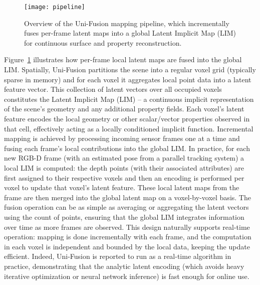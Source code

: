 \documentclass[english, bachelor, utf8]{base/thesis_telematics}
\begin{document}
\begin{figure}[!htb]
\centering
\texttt{[image: pipeline]}
\caption{Overview of the Uni-Fusion mapping pipeline, which incrementally fuses per-frame latent maps into a global Latent
Implicit Map (LIM) for continuous surface and property reconstruction.\cite{yuan2024uni}}
\label{fig:pipeline}
\end{figure}
Figure~\ref{fig:pipeline} illustrates how per-frame local latent maps are fused into the global LIM.
Spatially, Uni-Fusion partitions the scene into a regular voxel grid (typically sparse in memory) and for each voxel it
aggregates local point data into a latent feature vector. This collection of latent vectors over all occupied
voxels constitutes the Latent Implicit Map (LIM) -- a continuous implicit representation of the scene's geometry and any
additional property fields. Each voxel's latent feature encodes the local geometry or other scalar/vector properties observed in
that cell, effectively acting as a locally conditioned implicit function. Incremental mapping is achieved by processing incoming
sensor frames one at a time and fusing each frame's local contributions into the global LIM. In practice, for
each new RGB-D frame (with an estimated pose from a parallel tracking system) a local LIM is computed: the depth points
(with their associated attributes) are first assigned to their respective voxels and then an encoding is performed per voxel to
update that voxel's latent feature. These local latent maps from the frame are then merged into the global latent map on a
voxel-by-voxel basis. The fusion operation can be as simple as averaging or aggregating the latent vectors using the count of
points, ensuring that the global LIM integrates information over time as more frames are observed. This design naturally supports
real-time operation: mapping is done incrementally with each frame, and the computation in each voxel is independent and
bounded by the local data, keeping the update efficient. Indeed, Uni-Fusion is reported to run as a real-time algorithm in
practice, demonstrating that the analytic latent encoding (which avoids heavy iterative optimization or neural
network inference) is fast enough for online use.
\end{document}

